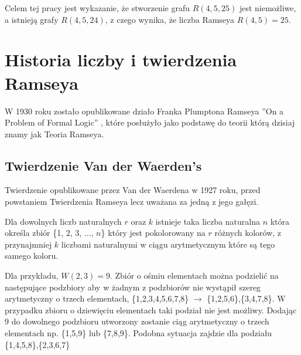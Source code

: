  \begin{figure}[H]
  \centering
    \caption{}
    \label{pgram}
 \end{figure}

Celem tej pracy jest wykazanie, że stworzenie grafu $R(4,5,25)$ jest niemożliwe, a istnieją grafy $R(4,5,24)$, z czego wynika, że liczba Ramseya $R(4,5) = 25$.


\section{Historia liczby i twierdzenia Ramseya}

W 1930 roku zostało opublikowane działo Franka Plumptona Ramseya ''On a Problem of Formal Logic''\cite{ramsey} , które posłużyło jako podstawę do teorii którą dzisiaj znamy jak Teoria Ramseya. 


\subsection{Twierdzenie Van der Waerden's}
Twierdzenie opublikowane przez Van der Waerdena w 1927 roku, przed powstaniem Twierdzenia Ramseya lecz uważana za jedną z jego gałęzi. 

\begin{theorem}
Dla dowolnych liczb naturalnych $r$ oraz $k$ istnieje taka liczba naturalna $n$ która określa zbiór \{1, 2, 3, ..., $n$\} który jest pokolorowany na $r$ różnych kolorów, z przynajmniej $k$ liczbami naturalnymi w ciągu arytmetycznym które są tego samego koloru.\cite{theory} 
\end{theorem}

Dla przykładu, $W(2,3) = 9$. Zbiór o ośmiu elementach można podzielić na następujące podzbiory aby w żadnym z podzbiorów nie wystąpił szereg arytmetyczny o trzech elementach, \{1,2,3,4,5,6,7,8\} $\to$ \{1,2,5,6\},\{3,4,7,8\}. W przypadku zbioru o dziewięciu elementach taki podział nie jest możliwy. Dodając 9 do dowolnego podzbioru utworzony zostanie ciąg arytmetyczny o trzech elementach np. \{1,5,9\} lub \{7,8,9\}. Podobna sytuacja zajdzie dla podziału \{1,4,5,8\},\{2,3,6,7\}

